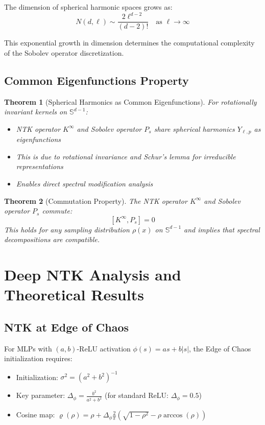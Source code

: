 \documentclass{article}
\newtheorem{theorem}{Theorem}[section]
\begin{document}
The dimension of spherical harmonic spaces grows as:
\[ N(d,\ell) \sim \frac{2\ell^{d-2}}{(d-2)!} \quad \text{as } \ell \to \infty \]

This exponential growth in dimension determines the computational complexity of the Sobolev operator discretization.

\subsection{Common Eigenfunctions Property}

\begin{theorem}[Spherical Harmonics as Common Eigenfunctions]
For rotationally invariant kernels on $\mathbb{S}^{d-1}$:
\begin{itemize}
\item NTK operator $K^{\infty}$ and Sobolev operator $P_s$ share spherical harmonics $Y_{\ell,p}$ as eigenfunctions
\item This is due to rotational invariance and Schur's lemma for irreducible representations
\item Enables direct spectral modification analysis
\end{itemize}
\end{theorem}

\begin{theorem}[Commutation Property]
The NTK operator $K^{\infty}$ and Sobolev operator $P_s$ commute:
\[ [K^{\infty}, P_s] = 0 \]
This holds for any sampling distribution $\rho(x)$ on $\mathbb{S}^{d-1}$ and implies that spectral decompositions are compatible.
\end{theorem}

\newpage

\section{Deep NTK Analysis and Theoretical Results}

\subsection{NTK at Edge of Chaos}

For MLPs with $(a,b)$-ReLU activation $\phi(s) = as + b|s|$, the Edge of Chaos initialization requires:
\begin{itemize}
\item Initialization: $\sigma^2 = (a^2+b^2)^{-1}$
\item Key parameter: $\Delta_\phi = \frac{b^2}{a^2+b^2}$ (for standard ReLU: $\Delta_\phi = 0.5$)
\item Cosine map: $\varrho(\rho) = \rho + \Delta_\phi \frac{2}{\pi}\left( \sqrt{1-\rho^2} - \rho \arccos(\rho) \right)$
\end{itemize}
\end{document}
